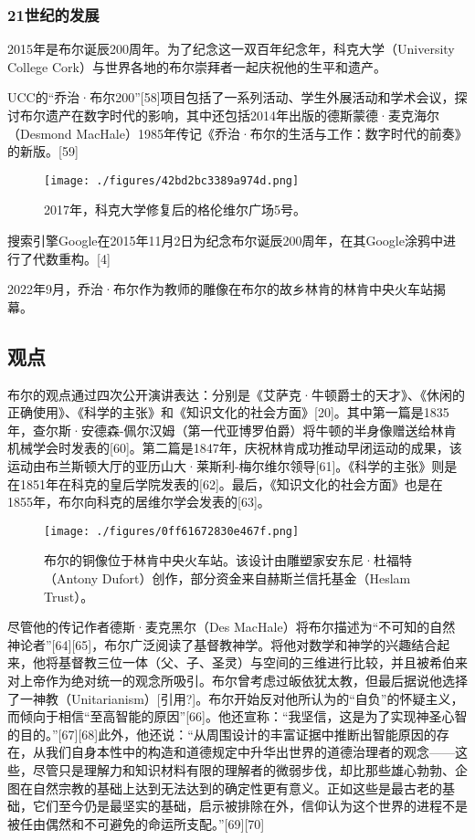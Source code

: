 \subsubsection{21世纪的发展} 
2015年是布尔诞辰200周年。为了纪念这一双百年纪念年，科克大学（University College Cork）与世界各地的布尔崇拜者一起庆祝他的生平和遗产。

UCC的“乔治·布尔200”[58]项目包括了一系列活动、学生外展活动和学术会议，探讨布尔遗产在数字时代的影响，其中还包括2014年出版的德斯蒙德·麦克海尔（Desmond MacHale）1985年传记《乔治·布尔的生活与工作：数字时代的前奏》的新版。[59]
\begin{figure}[ht]
\centering
\texttt{[image: ./figures/42bd2bc3389a974d.png]}
\caption{2017年，科克大学修复后的格伦维尔广场5号。} \label{fig_George_12}
\end{figure}
搜索引擎Google在2015年11月2日为纪念布尔诞辰200周年，在其Google涂鸦中进行了代数重构。[4]

2022年9月，乔治·布尔作为教师的雕像在布尔的故乡林肯的林肯中央火车站揭幕。
\subsection{观点}  
布尔的观点通过四次公开演讲表达：分别是《艾萨克·牛顿爵士的天才》、《休闲的正确使用》、《科学的主张》和《知识文化的社会方面》[20]。其中第一篇是1835年，查尔斯·安德森-佩尔汉姆（第一代亚博罗伯爵）将牛顿的半身像赠送给林肯机械学会时发表的[60]。第二篇是1847年，庆祝林肯成功推动早闭运动的成果，该运动由布兰斯顿大厅的亚历山大·莱斯利-梅尔维尔领导[61]。《科学的主张》则是在1851年在科克的皇后学院发表的[62]。最后，《知识文化的社会方面》也是在1855年，布尔向科克的居维尔学会发表的[63]。
\begin{figure}[ht]
\centering
\texttt{[image: ./figures/0ff61672830e467f.png]}
\caption{布尔的铜像位于林肯中央火车站。该设计由雕塑家安东尼·杜福特（Antony Dufort）创作，部分资金来自赫斯兰信托基金（Heslam Trust）。} \label{fig_George_11}
\end{figure}
尽管他的传记作者德斯·麦克黑尔（Des MacHale）将布尔描述为“不可知的自然神论者”[64][65]，布尔广泛阅读了基督教神学。将他对数学和神学的兴趣结合起来，他将基督教三位一体（父、子、圣灵）与空间的三维进行比较，并且被希伯来对上帝作为绝对统一的观念所吸引。布尔曾考虑过皈依犹太教，但最后据说他选择了一神教（Unitarianism）[引用?]。布尔开始反对他所认为的“自负”的怀疑主义，而倾向于相信“至高智能的原因”[66]。他还宣称：“我坚信，这是为了实现神圣心智的目的。”[67][68]此外，他还说：“从周围设计的丰富证据中推断出智能原因的存在，从我们自身本性中的构造和道德规定中升华出世界的道德治理者的观念——这些，尽管只是理解力和知识材料有限的理解者的微弱步伐，却比那些雄心勃勃、企图在自然宗教的基础上达到无法达到的确定性更有意义。正如这些是最古老的基础，它们至今仍是最坚实的基础，启示被排除在外，信仰认为这个世界的进程不是被任由偶然和不可避免的命运所支配。”[69][70]

